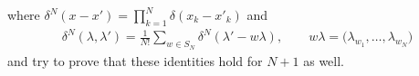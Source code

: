 where $\delta^N(x-x')=\prod_{k=1}^N\delta(x_k-x'_k)$ and{\samepage
\begin{gather}\label{deltaN}
\delta^N(\lambda, \lambda')=\frac1{N!}\sum_{w\in S_N} \delta^N(\lambda'-w\lambda), \qquad w\lambda=\big(\lambda_{w_1},\dots, \lambda_{w_N}\big)
\end{gather}
and try to prove that these identities hold for $N+1$ as well.}
